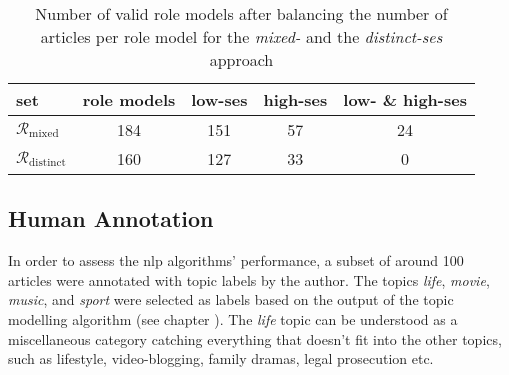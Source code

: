 \begin{table}
    \centering
    \begin{tabular}{lcccc}
        \toprule 
        set & role models & low-\gls{ses} & high-\gls{ses} & low- \& high-\gls{ses} \\ \toprule 
        $\mathcal{R}_\text{mixed}$ & \SI{184}{} & \SI{151}{} & \SI{57}{} & \SI{24}{} \\
        $\mathcal{R}_\text{distinct}$ & \SI{160}{} & \SI{127}{} & \SI{33}{} & \SI{0}{} \\
        \bottomrule
    \end{tabular}
    \caption{Number of valid role models after balancing the number of articles per role model for the \textit{mixed-} and the \textit{distinct-\gls{ses}} approach}
    \label{tab:role_models_after_balancing}
\end{table}

\subsection*{Human Annotation}
In order to assess the \gls{nlp} algorithms' performance, a subset of around \SI{100}{} articles were annotated with topic labels by the author. The topics \textit{life}, \textit{movie}, \textit{music}, and \textit{sport} were selected as labels based on the output of the topic modelling algorithm (see chapter ). The \textit{life} topic can be understood as a miscellaneous category catching everything that doesn't fit into the other topics, such as lifestyle, video-blogging, family dramas, legal prosecution etc.

